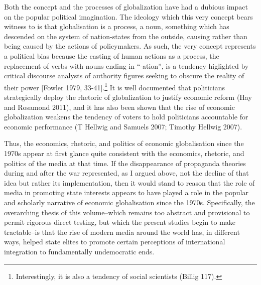 \documentclass[12pt,book]{article}
\begin{document}
Both the concept and the processes of globalization have had a dubious
impact on the popular political imagination. The ideology which this
very concept bears witness to is that globalisation is a process, a
noun, something which has descended on the system of nation-states from
the outside, causing rather than being caused by the actions of
policymakers. As such, the very concept represents a political bias
because the casting of human actions as a process, the replacement of
verbs with nouns ending in ``-ation'', is a tendency higlighted by
critical discourse analysts of authority figures seeking to obscure the
reality of their power {[}Fowler 1979, 33-41{]}.\footnote{Interestingly,
  it is also a tendency of social scientists (Billig 117).} It is well
documented that politicians strategically deploy the rhetoric of
globalization to justify economic reform (Hay and Rosamond 2011), and it
has also been shown that the rise of economic globalization weakens the
tendency of voters to hold politicians accountable for economic
performance (T Hellwig and Samuels 2007; Timothy Hellwig 2007).

Thus, the economics, rhetoric, and politics of economic globalisation
since the 1970s appear at first glance quite consistent with the
economics, rhetoric, and politics of the media at that time. If the
disappearance of propaganda theories during and after the war
represented, as I argued above, not the decline of that idea but rather
its implementation, then it would stand to reason that the role of media
in promoting state interests appears to have played a role in the
popular and scholarly narrative of economic globalisation since the
1970s. Specifically, the overarching thesis of this volume--which
remains too abstract and provisional to permit rigorous direct testing,
but which the present studies begin to make tractable--is that the rise
of modern media around the world has, in different ways, helped state
elites to promote certain perceptions of international integration to
fundamentally undemocratic ends.
\end{document}
